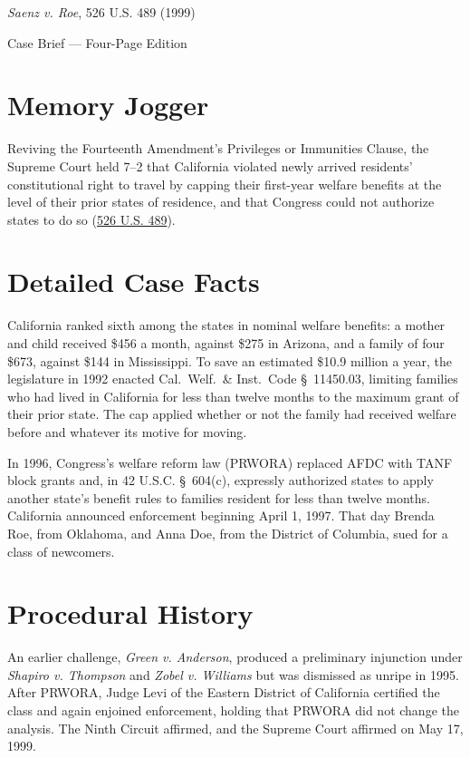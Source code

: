 \documentclass[12pt]{article}
\begin{document}
\begin{center}
{\LARGE \textit{Saenz v. Roe}, 526 U.S. 489 (1999)\par}
\vspace{0.8em}
{\large Case Brief --- Four-Page Edition\par}
\end{center}
\vspace{1em}

\section{Memory Jogger}

Reviving the Fourteenth Amendment's Privileges or Immunities Clause, the Supreme Court held 7--2 that California violated newly arrived residents' constitutional right to travel by capping their first-year welfare benefits at the level of their prior states of residence, and that Congress could not authorize states to do so (\href{https://www.law.cornell.edu/supremecourt/text/98-97}{526 U.S. 489}).

\section{Detailed Case Facts}

California ranked sixth among the states in nominal welfare benefits: a mother and child received \$456 a month, against \$275 in Arizona, and a family of four \$673, against \$144 in Mississippi. To save an estimated \$10.9 million a year, the legislature in 1992 enacted Cal.\ Welf.\ \& Inst.\ Code \S~11450.03, limiting families who had lived in California for less than twelve months to the maximum grant of their prior state. The cap applied whether or not the family had received welfare before and whatever its motive for moving.

In 1996, Congress's welfare reform law (PRWORA) replaced AFDC with TANF block grants and, in 42 U.S.C. \S~604(c), expressly authorized states to apply another state's benefit rules to families resident for less than twelve months. California announced enforcement beginning April 1, 1997. That day Brenda Roe, from Oklahoma, and Anna Doe, from the District of Columbia, sued for a class of newcomers.

\section{Procedural History}

An earlier challenge, \textit{Green v. Anderson}, produced a preliminary injunction under \textit{Shapiro v. Thompson} and \textit{Zobel v. Williams} but was dismissed as unripe in 1995. After PRWORA, Judge Levi of the Eastern District of California certified the class and again enjoined enforcement, holding that PRWORA did not change the analysis. The Ninth Circuit affirmed, and the Supreme Court affirmed on May 17, 1999.
\end{document}
